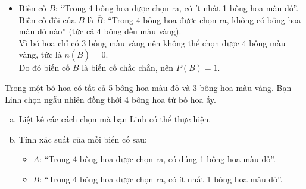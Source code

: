 \begin{bt}
{\begin{enumerate}[a)]
\begin{itemize}
        \item Biến cố $B$: “Trong 4 bông hoa được chọn ra, có ít nhất 1 bông hoa màu đỏ”.\\
        Biến cố đối của $B$ là $\overline{B}$: “Trong 4 bông hoa được chọn ra, không có bông hoa màu đỏ nào” (tức cả 4 bông đều màu vàng).\\
        Vì bó hoa chỉ có 3 bông màu vàng nên không thể chọn được 4 bông màu vàng, tức là $n(\overline{B}) = 0$.\\
        Do đó biến cố $B$ là biến cố chắc chắn, nên $P(B) = 1$.
    \end{itemize}
\end{enumerate}
}
\end{bt}

\begin{bt}%
Trong một bó hoa có tất cả 5 bông hoa màu đỏ và 3 bông hoa màu vàng. Bạn Linh chọn ngẫu nhiên đồng thời 4 bông hoa từ bó hoa ấy.
\begin{enumerate}[a)]
    \item Liệt kê các cách chọn mà bạn Linh có thể thực hiện.
    \item Tính xác suất của mỗi biến cố sau:
    \begin{itemize}
        \item $A$: “Trong 4 bông hoa được chọn ra, có đúng 1 bông hoa màu đỏ”.
        \item $B$: “Trong 4 bông hoa được chọn ra, có ít nhất 1 bông hoa màu đỏ”.
    \end{itemize}
\end{enumerate}
\end{bt}
